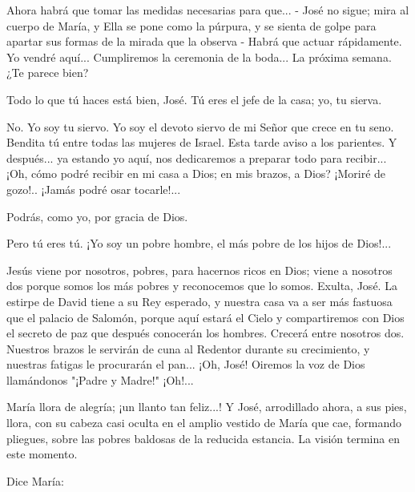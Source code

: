 \documentclass[12pt]{book} %
\begin{document}
Ahora habrá que tomar las medidas necesarias para que... - José no sigue; mira al cuerpo de María, y Ella se pone como la púrpura, y se sienta de golpe para apartar sus formas de la mirada que la observa - Habrá que actuar rápidamente. Yo vendré aquí... Cumpliremos la ceremonia de la boda... La próxima semana. ¿Te parece bien? 

Todo lo que tú haces está bien, José. Tú eres el jefe de la casa; yo, tu sierva. 

No. Yo soy tu siervo. Yo soy el devoto siervo de mi Señor que crece en tu seno. Bendita tú entre todas las mujeres de Israel. Esta tarde aviso a los parientes. Y después... ya estando yo aquí, nos dedicaremos a preparar todo para recibir... ¡Oh, cómo podré recibir en mi casa a Dios; en mis brazos, a Dios? ¡Moriré de gozo!.. ¡Jamás podré osar tocarle!... 

Podrás, como yo, por gracia de Dios. 

Pero tú eres tú. ¡Yo soy un pobre hombre, el más pobre de los hijos de Dios!... 

Jesús viene por nosotros, pobres, para hacernos ricos en Dios; viene a nosotros dos porque somos los más pobres y reconocemos que lo somos. Exulta, José. La estirpe de David tiene a su Rey esperado, y nuestra casa va a ser más fastuosa que el palacio de Salomón, porque aquí estará el Cielo y compartiremos con Dios el secreto de paz que después conocerán los hombres. Crecerá entre nosotros dos. Nuestros brazos le servirán de cuna al Redentor durante su crecimiento, y nuestras fatigas le procurarán el pan... ¡Oh, José! Oiremos la voz de Dios llamándonos "¡Padre y Madre!" ¡Oh!... 

María llora de alegría; ¡un llanto tan feliz...! Y José, arrodillado ahora, a sus pies, llora, con su cabeza casi oculta en el amplio vestido de María que cae, formando pliegues, sobre las pobres baldosas de la reducida estancia. La visión termina en este momento. 

Dice María: 
\end{document}
